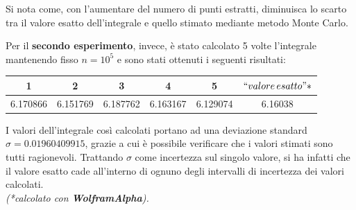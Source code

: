 \documentclass[a4paper, 12pt, oneside]{article}
\begin{document}
	
	Si nota come, con l'aumentare del numero di punti estratti, diminuisca lo scarto tra il valore esatto dell'integrale e quello stimato mediante metodo Monte Carlo.
	
	Per il \textbf{secondo esperimento}, invece, è stato calcolato 5 volte l'integrale mantenendo fisso $n = 10^5$ e sono stati ottenuti i seguenti risultati:
	
	\begin{center}
		\begin{tabular}{| c | c | c | c | c | c |}
			\hline
			1 & 2 & 3 & 4 & 5 & $``valore\,esatto"*$ \\
			\hline
			6.170866 & 6.151769 & 6.187762 & 6.163167 & 6.129074 & 6.16038\\
			\hline
		\end{tabular}		
	\end{center}
	I valori dell'integrale così calcolati portano ad una deviazione standard $\sigma = 0.01960409915$, grazie a cui è possibile verificare che i valori stimati sono tutti ragionevoli. Trattando $\sigma$ come incertezza sul singolo valore, si ha infatti che il valore esatto cade all'interno di ognuno degli intervalli di incertezza dei valori calcolati.\\
	\textit{(*calcolato con \textbf{WolframAlpha}).}
	
\end{document}
